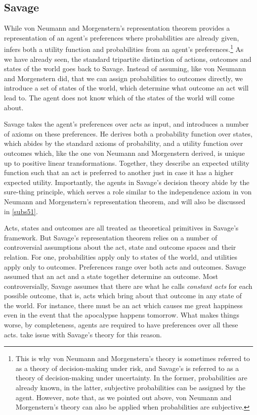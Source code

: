 \subsection{Savage}\label{subs23}

While von Neumann and Morgenstern's representation theorem provides a representation of an agent's preferences where probabilities are already given, \citet{Savage1954} infers both a utility function and probabilities from an agent's preferences.\footnote{This is why von Neumann and Morgenstern's theory is sometimes referred to as a theory of decision-making under risk, and Savage's is referred to as a theory of decision-making under uncertainty. In the former, probabilities are already known, in the latter, subjective probabilities can be assigned by the agent. However, note that, as we pointed out above, von Neumann and Morgenstern's theory can also be applied when probabilities are subjective.} As we have already seen, the standard tripartite distinction of actions, outcomes and states of the world goes back to Savage. Instead of assuming, like von Neumann and Morgenstern did, that we can assign probabilities to outcomes directly, we introduce a set of states of the world, which determine what outcome an act will lead to. The agent does not know which of the states of the world will come about.

Savage takes the agent's preferences over acts as input, and introduces a number of axioms on these preferences. He derives both a probability function over states, which abides by the standard axioms of probability, and a utility function over outcomes which, like the one von Neumann and Morgenstern derived, is unique up to positive linear transformations. Together, they describe an expected utility function such that an act is preferred to another just in case it has a higher expected utility. Importantly, the agents in Savage's decision theory abide by the sure-thing principle, which serves a role similar to the independence axiom in von Neumann and Morgenstern's representation theorem, and will also be discussed in \autoref{subs51}.

Acts, states and outcomes are all treated as theoretical primitives in Savage's framework. But Savage's representation theorem relies on a number of controversial assumptions about the act, state and outcome spaces and their relation. For one, probabilities apply only to states of the world, and utilities apply only to outcomes. Preferences range over both acts and outcomes. Savage assumed that an act and a state together determine an outcome. Most controversially, Savage assumes that there are what he calls {\em constant acts} for each possible outcome, that is, acts which bring about that outcome in any state of the world. For instance,  there must be an act which causes me great happiness even in the event that the apocalypse happens tomorrow. What makes things worse, by completeness, agents are required to have preferences over all these acts. \citet{LuceSuppes1965} take issue with Savage's theory for this reason.

